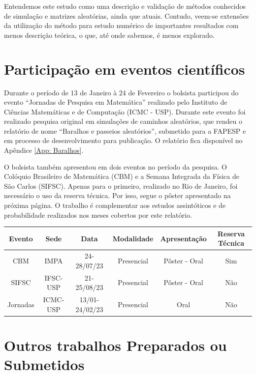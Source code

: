 \documentclass[12pt]{report}
\begin{document}
Entendemos este estudo como uma descrição e validação de métodos conhecidos de simulação e matrizes aleatórias, ainda que atuais. Contudo, veem-se extensões da utilização do método para estudo numérico de importantes resultados com menos descrição teórica, o que, até onde sabemos, é menos explorado.

\chapter{Participação em eventos científicos}\label{chp:particEvento}

Durante o período de 13 de Janeiro à 24 de Fevereiro o bolsista participou do evento ``Jornadas de Pesquisa em Matemática'' realizado pelo Instituto de Ciências Matemáticas e de Computação (ICMC - USP). Durante este evento foi realizado pesquisa original em simulações de caminhos aleatórios, que rendeu o relatório de nome ``Baralhos e passeios aleatórios'', submetido para a FAPESP e em processo de desenvolvimento para publicação. O relatório fica disponível no Apêndice \ref{App: Baralhos}.

O bolsista também apresentou em dois eventos no período da pesquisa. O Colóquio Brasileiro de Matemática (CBM) e a Semana Integrada da Física de São Carlos (SIFSC). Apenas para o primeiro, realizado no Rio de Janeiro, foi necessário o uso da reserva técnica. Por isso, segue o pôster apresentado na próxima página. O trabalho é complementar aos estudos assintóticos e de probabilidade realizados nos meses cobertos por este relatório.

\hspace{1cm}

\begin{center}
	\begin{tabular}{|c|c|c|c|c|c|}
		\hline
		Evento &  Sede & Data & Modalidade & Apresentação & Reserva Técnica \\
		\hline
		CBM & IMPA & 24-28/07/23 & Presencial & Pôster - Oral & Sim \\
		\hline
		SIFSC & IFSC-USP & 21-25/08/23 & Presencial & Pôster - Oral & Não \\
		\hline
		Jornadas & ICMC-USP & 13/01-24/02/23 & Presencial & Oral & Não \\
		\hline
	\end{tabular}
\end{center}


\chapter{Outros trabalhos Preparados ou Submetidos}
\end{document}
